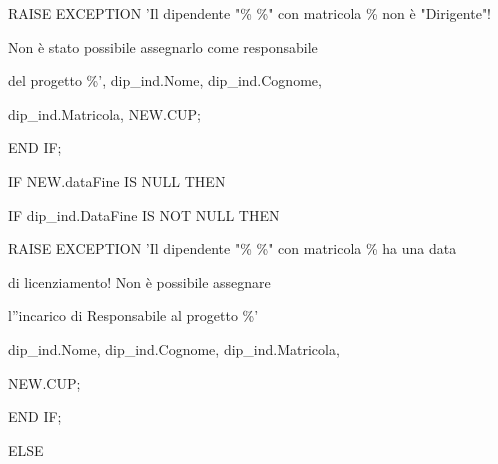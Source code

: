 \begin{flushleft}
\begin{description}
\begin{description}
                    \vspace{0.2cm}
                    \begin{description}
                        \item RAISE EXCEPTION 'Il dipendente "\% \%" con matricola \% non è "Dirigente"!
                        \item \hspace{3cm}Non è stato possibile assegnarlo come responsabile
                        \item \hspace{3cm} del progetto \%', dip\_ind.Nome, dip\_ind.Cognome,
                        \item \hspace{3cm}dip\_ind.Matricola, NEW.CUP;
                    \end{description}
                    \item END IF;
                    \item
                    \item IF NEW.dataFine IS NULL THEN
                    \vspace{0.2cm}
                    \begin{description}
                        \item IF dip\_ind.DataFine IS NOT NULL THEN
                        \vspace{0.2cm}
                        \begin{description}
                            \item RAISE EXCEPTION 'Il dipendente "\% \%" con matricola \% ha una data
                            \item \hspace{3cm}di licenziamento! Non è possibile assegnare
                            \item \hspace{3cm}l''incarico di Responsabile al progetto \%'
                            \item \hspace{3cm}dip\_ind.Nome, dip\_ind.Cognome, dip\_ind.Matricola,
                            \item \hspace{3cm}NEW.CUP;
                        \end{description}
                        \item END IF;
                    \end{description}
                    \item ELSE
                    

\end{description}
\end{description}
\end{flushleft}

